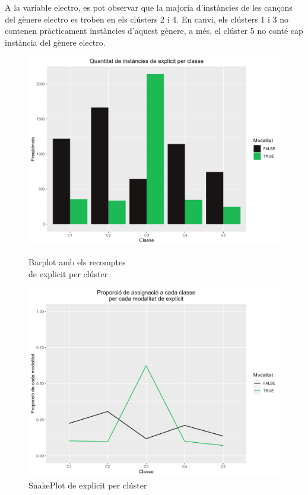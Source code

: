 \documentclass{article}
\begin{document}
A la variable electro, es pot observar que la majoria d'instàncies de les cançons del gènere electro es troben en els clústers 2 i 4. En canvi, els clústers 1 i 3 no contenen pràcticament instàncies d'aquest gènere, a més, el clúster 5 no conté cap instància del gènere electro.

\begin{figure}[H]
\centering
    \begin{minipage}{.49\textwidth}
        \centering
        \includegraphics[width=0.95\linewidth]{Images/5_Profiling/categoriques/cat/Cat_BarPlot_explicit.png}
        \caption{Barplot amb els recomptes \\ de explicit per clúster}
        \label{fig:Cat_BarPlot_explicit}
    \end{minipage}%
    \begin{minipage}{.49\textwidth}
        \centering
        \includegraphics[width=0.95\linewidth]{Images/5_Profiling/categoriques/cat/Cat_SnakePlot_explicit.png}
        \caption{SnakePlot de explicit per clúster}
        \label{fig:Cat_SnakePlot_explicit}
    \end{minipage}%
\end{figure}
\end{document}

